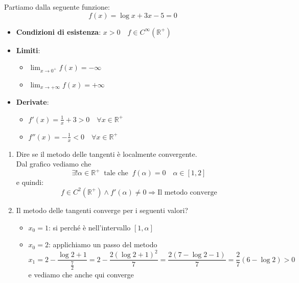 \begin{example}
	Partiamo dalla seguente funzione:
	\begin{equation*}
		f(x)=\log x +3x - 5 = 0
	\end{equation*}
	\begin{itemize}
		\item \textbf{Condizioni di esistenza}: $x>0 \quad f \in C^\infty(\mathbb{R}^+)$
		\item \textbf{Limiti}:
		\begin{itemize}
			\item $\lim_{x\to 0^+} f(x) = - \infty$
			\item $\lim_{x \to +\infty} f(x) = + \infty$
		\end{itemize}
		\item \textbf{Derivate}:
		\begin{itemize}
			\item $f'(x)=\frac{1}{x} + 3 > 0 \quad \forall x \in \mathbb{R^+}$
			\item $f''(x)=-\frac{1}{x}<0 \quad \forall x \in \mathbb{R}^+$
		\end{itemize}
	\end{itemize}
	
	\begin{center}
	\end{center}
	
	\begin{enumerate}
		\item Dire se il metodo delle tangenti è localmente convergente. \\
		Dal grafico vediamo che
		\begin{equation*}
			\exists ! \alpha \in \mathbb{R}^+ \: \text{ tale che }\: f(\alpha)=0 \quad \alpha \in [1,2]
		\end{equation*}
		e quindi:
		\begin{equation*}
			f \in C^2(\mathbb{R}^+) \land f'(\alpha)\neq 0 \Longrightarrow \text{Il metodo converge}
		\end{equation*}
		\item Il metodo delle tangenti converge per i seguenti valori?
		\begin{itemize}
			\item $x_0 = 1$: si perché è nell'intervallo $[1, \alpha]$
			\item $x_0 = 2$: applichiamo un passo del metodo
			\begin{equation*}
				x_1 = 2 - \frac{\log 2 + 1}{\frac{7}{2}} = 2 - \frac{2(\log 2 + 1)^2}{7} = \frac{2(7-\log 2 - 1)}{7} = \frac{2}{7} (6-\log 2) > 0
			\end{equation*}
			e vediamo che anche qui converge
		\end{itemize}
	\end{enumerate}
\end{example}

